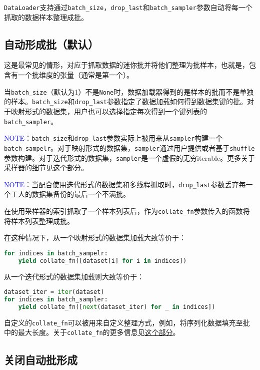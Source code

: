 \documentclass[../main.tex]{subfile}
\begin{document}
\lstinline{DataLoader}支持通过\lstinline{batch_size}，\lstinline{drop_last}和\lstinline{batch_sampler}参数自动将每一个抓取的数据样本整理成批。

\subsection{自动形成批（默认）}

这是最常见的情形，对应于抓取数据的迷你批并将他们整理为批样本，也就是，包含有一个批维度的张量（通常是第一个）。

当\lstinline{batch_size}（默认为1）不是\lstinline{None}时，数据加载器得到的是样本的批而不是单独的样本。\lstinline{batch_size}和\lstinline{drop_last}参数指定了数据加载如何得到数据集键的批。对于映射形式的数据集，用户也可以选择指定每次得到一个键列表的\lstinline{batch_sampler}。

\textcolor{blue}{NOTE}：\lstinline{batch_size}和\lstinline{drop_last}参数实际上被用来从\lstinline{sampler}构建一个\lstinline{batch_sampelr}。对于映射形式的数据集，\lstinline{sampler}通过用户提供或者基于\lstinline{shuffle}参数构建。对于迭代形式的数据集，\lstinline{sampler}是一个虚假的无穷iterable。更多关于采样器的细节见\href{https://pytorch.org/docs/stable/data.html#data-loading-order-and-sampler}{这个部分}。

\textcolor{blue}{NOTE}：当配合使用迭代形式的数据集和多线程抓取时，\lstinline{drop_last}参数丢弃每一个工人的数据集备份的最后一个不满批。

在使用采样器的索引抓取了一个样本列表后，作为\lstinline{collate_fn}参数传入的函数将将样本列表整理成批。

在这种情况下，从一个映射形式的数据集加载大致等价于：
\begin{lstlisting}[language=Python]
for indices in batch_sampelr:
    yield collate_fn([dataset[i] for i in indices])
\end{lstlisting}
从一个迭代形式的数据集加载则大致等价于：
\begin{lstlisting}[language=Python]
dataset_iter = iter(dataset)
for indices in batch_sampler:
    yield collate_fn([next(dataset_iter) for _ in indices])
\end{lstlisting}

自定义的\lstinline{collate_fn}可以被用来自定义整理方式，例如，将序列化数据填充至批中的最大长度。关于\lstinline{collate_fn}的更多信息见\href{https://pytorch.org/docs/stable/data.html#dataloader-collate-fn}{这个部分}。

\subsection{关闭自动批形成}
\end{document}
